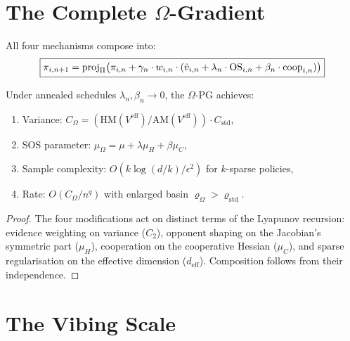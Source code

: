 \section{The Complete $\Omega$-Gradient}
\label{sec:omega}

All four mechanisms compose into:
\begin{equation}
\label{eq:omega-ch3}
\boxed{
    \pi_{i,n+1} = \operatorname{proj}_\Pi\bigl(\pi_{i,n} + \gamma_n \cdot w_{i,n} \cdot (\hat{v}_{i,n} + \lambda_n \cdot \text{OS}_{i,n} + \beta_n \cdot \text{coop}_{i,n})\bigr)
}
\end{equation}

\begin{theorem}
\label{thm:omega-ch3}
Under annealed schedules $\lambda_n, \beta_n \to 0$, the $\Omega$-PG achieves:
\begin{enumerate}[label=(\roman*)]
    \item Variance: $C_\Omega = (\text{HM}(V^{\text{eff}})/\text{AM}(V^{\text{eff}})) \cdot C_{\text{std}}$,
    \item SOS parameter: $\mu_\Omega = \mu + \lambda\mu_H + \beta\mu_C$,
    \item Sample complexity: $O(k \log(d/k) / \epsilon^2)$ for $k$-sparse policies,
    \item Rate: $O(C_\Omega / n^q)$ with enlarged basin $\varrho_\Omega > \varrho_{\text{std}}$.
\end{enumerate}
\end{theorem}

\begin{proof}
The four modifications act on distinct terms of the Lyapunov recursion: evidence weighting on variance ($C_2$), opponent shaping on the Jacobian's symmetric part ($\mu_H$), cooperation on the cooperative Hessian ($\mu_C$), and sparse regularisation on the effective dimension ($d_{\text{eff}}$). Composition follows from their independence.
\end{proof}


\section{The Vibing Scale}
\label{sec:vibing-horseshoe}


